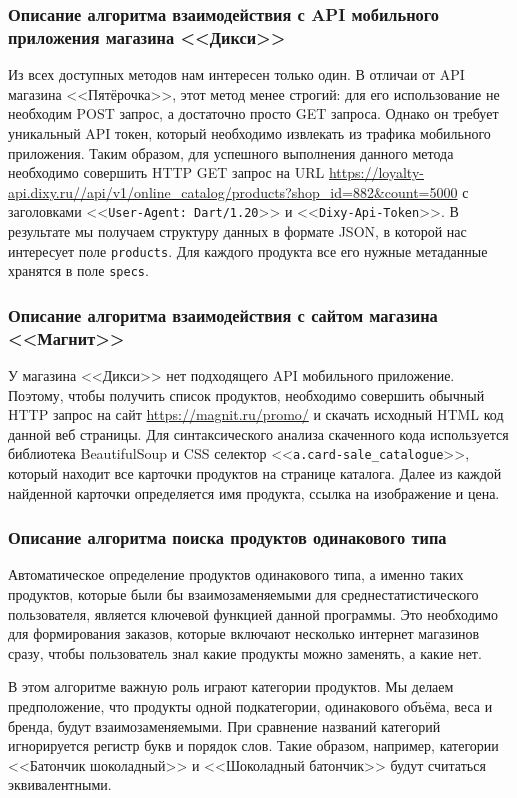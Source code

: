 \documentclass[a4paper,12pt]{article}
\begin{document}
  \subsubsection{Описание алгоритма взаимодействия с API мобильного приложения магазина <<Дикси>>}
  Из всех доступных методов нам интересен только один.
  В отличаи от API магазина <<Пятёрочка>>, этот метод менее строгий:
  для его использование не необходим POST запрос, а достаточно просто GET запроса.
  Однако он требует уникальный API токен, который необходимо извлекать из трафика мобильного приложения.
  Таким образом, для успешного выполнения данного метода необходимо совершить HTTP GET запрос на URL
  \url{https://loyalty-api.dixy.ru//api/v1/online_catalog/products?shop_id=882&count=5000}
  с заголовками <<\texttt{User-Agent: Dart/1.20}>> и <<\texttt{Dixy-Api-Token}>>.
  В результате мы получаем структуру данных в формате JSON, в которой нас интересует поле \texttt{products}.
  Для каждого продукта все его нужные метаданные хранятся в поле \texttt{specs}.

  \subsubsection{Описание алгоритма взаимодействия с сайтом магазина <<Магнит>>}
  У магазина <<Дикси>> нет подходящего API мобильного приложение.
  Поэтому, чтобы получить список продуктов, необходимо совершить обычный HTTP запрос на сайт \url{https://magnit.ru/promo/}
  и скачать исходный HTML код данной веб страницы.
  Для синтаксического анализа скаченного кода используется библиотека BeautifulSoup
  и CSS селектор <<\texttt{a.card-sale\_catalogue}>>, который находит все карточки продуктов на странице каталога.
  Далее из каждой найденной карточки определяется имя продукта, ссылка на изображение и цена.

  \subsubsection{Описание алгоритма поиска продуктов одинакового типа}
  \label{sec:search}
  Автоматическое определение продуктов одинакового типа,
  а именно таких продуктов, которые были бы взаимозаменяемыми для среднестатистического пользователя,
  является ключевой функцией данной программы.
  Это необходимо для формирования заказов, которые включают несколько интернет магазинов сразу,
  чтобы пользователь знал какие продукты можно заменять, а какие нет.

  В этом алгоритме важную роль играют категории продуктов.
  Мы делаем предположение, что продукты одной подкатегории, одинакового объёма, веса и бренда, будут взаимозаменяемыми.
  При сравнение названий категорий игнорируется регистр букв и порядок слов.
  Такие образом, например, категории <<Батончик шоколадный>> и <<Шоколадный батончик>> будут считаться эквивалентными.
\end{document}
